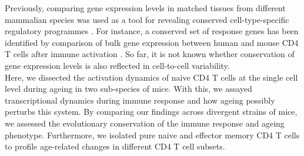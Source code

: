 Previously, comparing gene expression levels in matched tissues from different mammalian species was used as a tool for revealing conserved cell-type-specific regulatory programmes \citep{Sudmant2015, Finseth2014, Brawand2011, Flajnik2009}. For instance, a conserved set of response genes has been identified by comparison of bulk gene expression between human and mouse CD4\plus{} T cells after immune activation \citep{Shay2013}. So far, it is not known whether conservation of gene expression levels is also reflected in cell-to-cell variability.\\

Here, we dissected the activation dynamics of naive CD4\plus{} T cells at the single cell level during ageing in two sub-species of mice. With this, we assayed transcriptional dynamics during immune response and how ageing possibly perturbs this system. By comparing our findings across divergent strains of mice, we assessed the evolutionary conservation of the immune response and ageing phenotype. Furthermore, we isolated pure naive and effector memory CD4\plus{} T cells to profile age-related changes in different CD4\plus{} T cell subsets.
